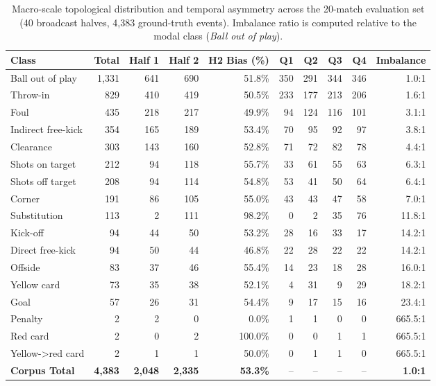 \begin{table}[t]
\centering
\small
\caption{Macro-scale topological distribution and temporal asymmetry across the 20-match evaluation set (40 broadcast halves, 4,383 ground-truth events). Imbalance ratio is computed relative to the modal class (\textit{Ball out of play}).}
\label{tab:twenty_matches_macro_distribution}
\begin{tabular}{lrrrrrrrrr}
\toprule
\textbf{Class} & \textbf{Total} & \textbf{Half 1} & \textbf{Half 2} & \textbf{H2 Bias (\%)} & \textbf{Q1} & \textbf{Q2} & \textbf{Q3} & \textbf{Q4} & \textbf{Imbalance} \\
\midrule
Ball out of play & 1,331 & 641 & 690 & 51.8\% & 350 & 291 & 344 & 346 & 1.0:1 \\
Throw-in & 829 & 410 & 419 & 50.5\% & 233 & 177 & 213 & 206 & 1.6:1 \\
Foul & 435 & 218 & 217 & 49.9\% & 94 & 124 & 116 & 101 & 3.1:1 \\
Indirect free-kick & 354 & 165 & 189 & 53.4\% & 70 & 95 & 92 & 97 & 3.8:1 \\
Clearance & 303 & 143 & 160 & 52.8\% & 71 & 72 & 82 & 78 & 4.4:1 \\
Shots on target & 212 & 94 & 118 & 55.7\% & 33 & 61 & 55 & 63 & 6.3:1 \\
Shots off target & 208 & 94 & 114 & 54.8\% & 53 & 41 & 50 & 64 & 6.4:1 \\
Corner & 191 & 86 & 105 & 55.0\% & 43 & 43 & 47 & 58 & 7.0:1 \\
Substitution & 113 & 2 & 111 & 98.2\% & 0 & 2 & 35 & 76 & 11.8:1 \\
Kick-off & 94 & 44 & 50 & 53.2\% & 28 & 16 & 33 & 17 & 14.2:1 \\
Direct free-kick & 94 & 50 & 44 & 46.8\% & 22 & 28 & 22 & 22 & 14.2:1 \\
Offside & 83 & 37 & 46 & 55.4\% & 14 & 23 & 18 & 28 & 16.0:1 \\
Yellow card & 73 & 35 & 38 & 52.1\% & 4 & 31 & 9 & 29 & 18.2:1 \\
Goal & 57 & 26 & 31 & 54.4\% & 9 & 17 & 15 & 16 & 23.4:1 \\
Penalty & 2 & 2 & 0 & 0.0\% & 1 & 1 & 0 & 0 & 665.5:1 \\
Red card & 2 & 0 & 2 & 100.0\% & 0 & 0 & 1 & 1 & 665.5:1 \\
Yellow->red card & 2 & 1 & 1 & 50.0\% & 0 & 1 & 1 & 0 & 665.5:1 \\
\midrule
\textbf{Corpus Total} & \textbf{4,383} & \textbf{2,048} & \textbf{2,335} & \textbf{53.3\%} & -- & -- & -- & -- & \textbf{1.0:1} \\
\bottomrule
\end{tabular}
\end{table}


